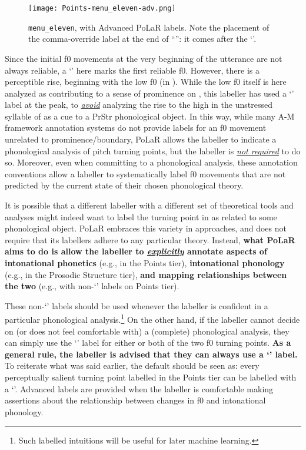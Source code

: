 \begin{figure}[H]
\centering
%
\texttt{[image: Points-menu\_eleven-adv.png]}
%
\caption[\texttt{menu\_eleven}, with Advanced PoLaR labels.]{\texttt{menu\_eleven}, with Advanced PoLaR labels. Note the placement of the comma-override label at the end of “”: it comes after the ‘\textlabel{]>}’. %
\label{fig:menu_eleven Points Adv}%
}
\end{figure}

Since the initial f0 movements at the very beginning of the utterance are not always reliable, a ‘’ here marks the first reliable f0. However, there is a perceptible rise, beginning with the low f0 (in ). While the low f0 itself is here analyzed as contributing to a sense of prominence on , this labeller has used a ‘’ label at the peak, to \textit{\uline{avoid}} analyzing the rise to the high in the unstressed syllable of  as a cue to a PrStr phonological object. In this way, while many A-M framework annotation systems do not provide labels for an f0 movement unrelated to prominence\slash boundary, PoLaR allows the labeller to indicate a phonological analysis of pitch turning points, but the labeller is \textit{\uline{not required}} to do so. Moreover, even when committing to a phonological analysis, these annotation conventions allow a labeller to systematically label f0 movements that are not predicted by the current state of their chosen phonological theory.

It is possible that a different labeller with a different set of theoretical tools and analyses might indeed want to label the turning point in  as related to some phonological object. PoLaR embraces this variety in approaches, and does not require that its labellers adhere to any particular theory. Instead, \textbf{what PoLaR aims to do is allow the labeller to \textit{\uline{explicitly}} annotate aspects of intonational phonetics} (e.g., in the Points tier), \textbf{intonational phonology} (e.g., in the Prosodic Structure tier), \textbf{and mapping relationships between the two} (e.g., with non-‘’ labels on Points tier).

These non-‘’ labels should be used whenever the labeller is confident in a particular phonological analysis.\footnote{Such labelled intuitions will be useful for later machine learning.} On the other hand, if the labeller cannot decide on (or does not feel comfortable with) a (complete) phonological analysis, they can simply use the ‘’ label for either or both of the two f0 turning points. \textbf{As a general rule, the labeller is advised that they can always use a ‘’ label.} To reiterate what was said earlier, the default should be seen as: every perceptually salient turning point labelled in the Points tier can be labelled with a ‘’. Advanced labels are provided when the labeller is comfortable making assertions about the relationship between changes in f0 and intonational phonology.

